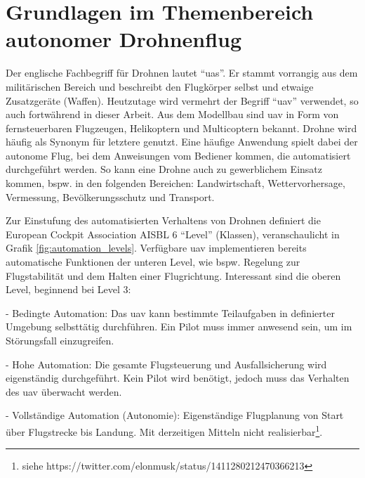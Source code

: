 
\chapter{Grundlagen im Themenbereich autonomer Drohnenflug}

Der englische Fachbegriff für Drohnen lautet \enquote{\gls{uas}}. Er stammt vorrangig aus dem militärischen Bereich und beschreibt den Flugkörper selbst und etwaige Zusatzgeräte (Waffen). Heutzutage wird vermehrt der Begriff \enquote{\gls{uav}} verwendet, so auch fortwährend in dieser Arbeit. Aus dem Modellbau sind \gls{uav} in Form von fernsteuerbaren Flugzeugen, Helikoptern und Multicoptern bekannt. Drohne wird häufig als Synonym für letztere genutzt. Eine häufige Anwendung spielt dabei der autonome Flug, bei dem Anweisungen vom Bediener kommen, die automatisiert durchgeführt werden. So kann eine Drohne auch zu gewerblichem Einsatz kommen, bspw. in den folgenden Bereichen: Landwirtschaft, Wettervorhersage, Vermessung, Bevölkerungsschutz und Transport.

Zur Einstufung des automatisierten Verhaltens von Drohnen definiert die European Cockpit Association AISBL 6 \enquote{Level} (Klassen), veranschaulicht in Grafik \ref{fig:automation_levels}.
Verfügbare \gls{uav} implementieren bereits automatische Funktionen der unteren Level, wie bspw. Regelung zur Flugstabilität und dem Halten einer Flugrichtung. Interessant sind die oberen Level, beginnend bei Level 3:

\begin{compactenum}[{Level} 1]
    \setcounter{enumi}{2}
	\item - Bedingte Automation: Das \gls{uav} kann bestimmte Teilaufgaben in definierter Umgebung selbsttätig durchführen. Ein Pilot muss immer anwesend sein, um im Störungsfall einzugreifen.
	\item - Hohe Automation: Die gesamte Flugsteuerung und Ausfallsicherung wird eigenständig durchgeführt. Kein Pilot wird benötigt, jedoch muss das Verhalten des \gls{uav} überwacht werden.
	\item - Vollständige Automation (Autonomie): Eigenständige Flugplanung von Start über Flugstrecke bis Landung. Mit derzeitigen Mitteln nicht realisierbar\footnote{siehe https://twitter.com/elonmusk/status/1411280212470366213}.
\end{compactenum}

